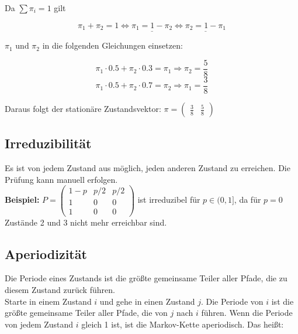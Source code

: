 Da \(\sum \pi_i=1\) gilt

\begin{equation*}
    \pi_1 + \pi_2 = 1 \Leftrightarrow \underline{\pi_1 = 1 - \pi_2} \Leftrightarrow \underline{\pi_2 = 1 - \pi_1}
\end{equation*}

\(\pi_1\) und \(\pi_2\) in die folgenden Gleichungen einsetzen:

\begin{equation*}
    \pi_1 \cdot 0.5 + \pi_2 \cdot 0.3 = \pi_1 \Longrightarrow \pi_2 = \frac{5}{8}
\end{equation*}
\begin{equation*}
    \pi_1 \cdot 0.5 + \pi_2 \cdot 0.7 = \pi_2 \Longrightarrow \pi_1 = \frac{3}{8}
\end{equation*}

Daraus folgt der stationäre Zustandsvektor: \(\pi = \begin{pmatrix}
    \frac{3}{8} & \frac{5}{8}
\end{pmatrix}\)



\subsection{Irreduzibilität}

Es ist von jedem Zustand aus möglich, jeden anderen Zustand zu erreichen.
Die Prüfung kann manuell erfolgen.\\

\textbf{Beispiel:}
\(
    P = \begin{pmatrix}
        1-p & p/2 & p/2\\
        1 & 0 & 0\\
        1 & 0 & 0
    \end{pmatrix}
\) ist irreduzibel für \(p\in (0,1]\), da für \(p=0\) Zustände 2 und 3 nicht mehr erreichbar sind.

\subsection{Aperiodizität}

Die Periode eines Zustands ist die größte gemeinsame Teiler aller Pfade, die zu diesem Zustand zurück führen.\\

Starte in einem Zustand \(i\) und gehe in einen Zustand \(j\). Die Periode von \(i\) ist die größte gemeinsame Teiler aller Pfade, die von \(j\) nach \(i\) führen.
Wenn die Periode von jedem Zustand \(i\) gleich 1 ist, ist die Markov-Kette aperiodisch. Das heißt:

